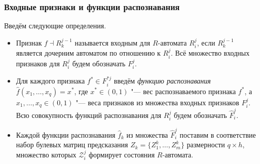 \documentclass[default]{beamer}
\begin{document}
	\begin{frame}
		\frametitle{Входные признаки и функции распознавания}
		Введём следующие определения.
		\begin{itemize}
			\item 
			Признак $f\dashv R_k^{j-1}$ называется входным для $R$-автомата $R_i^j$, если $R_k^{j-1}$ является дочерним автоматом по отношению к $R_i^j$. Всё множество входных признаков для $R_i^j$ будем обозначать $F_i^j$.
			\item
			Для каждого признака $f^*{\in}F_i^{*j}$ введём \textit{функцию распознавания} $\hat{f}(x_1,\dots,x_q)=x^*$, где $x^*{\in}(0,1)$ "--- вес распознаваемого признака $f^*$, а $x_1,\dots,x_q{\in}(0,1)$ "--- веса признаков из множества входных признаков $F_i^j$. Всю совокупность функций распознавания для $R_i^j$ будем обозначать $\hat{F}_i^j$.
			\item Каждой функции распознавания $\hat{f}_k$ из множества $\hat F_i^j$ поставим в соответствие набор булевых матриц предсказания $Z_k=\{Z_1^k,…,Z_m^k\}$ размерности $q\times h$, множество которых $\mathcal Z_i^j$ формирует состояния $R$-автомата.
		\end{itemize}
	\end{frame}
	
\end{document}
